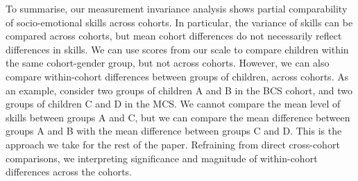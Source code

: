 To summarise, our measurement invariance analysis shows partial comparability of socio-emotional skills across cohorts. In particular, the variance of skills can be compared across cohorts, but mean cohort differences do not necessarily reflect differences in skills. We can use scores from our scale to compare children within the same cohort-gender group, but not across cohorts. However, we can also compare within-cohort differences between groups of children, across cohorts. As an example, consider two groups of children A and B in the BCS cohort, and two groups of children C and D in the MCS. We cannot compare the mean level of skills between groups A and C, but we can compare the mean difference between groups A and B with the mean difference between groups C and D. This is the approach we take for the rest of the paper. Refraining from direct cross-cohort comparisons, we interpreting significance and magnitude of within-cohort differences across the cohorts.
